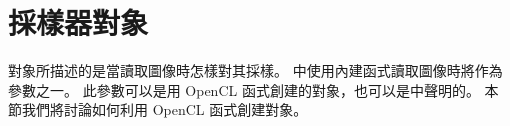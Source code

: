\section{採樣器對象}

對象所描述的是當讀取圖像時怎樣對其採樣。
中使用內建函式讀取圖像時將作為參數之一。
此參數可以是用 OpenCL 函式創建的對象，也可以是中聲明的。
本節我們將討論如何利用 OpenCL 函式創建對象。




